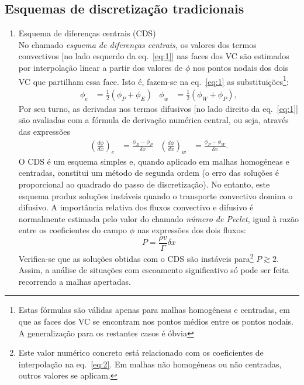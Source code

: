 \documentclass[11pt,twoside]{article}
\begin{document}
{\subsection{Esquemas de discretização tradicionais}
\begin{enumerate}
    \item Esquema de diferenças centrais (CDS)\\
No chamado \emph{esquema de diferenças centrais,} os valores dos termos
convectivos [no lado esquerdo da eq.~\eqref{eq:1}] nas faces dos VC são
estimados por interpolação linear a partir dos valores de $\phi$ nos pontos
nodais dos dois VC que partilham essa face. Isto é, fazem-se na eq.~\eqref{eq:1}
as substituições\footnote{Estas fórmulas são válidas apenas para malhas
    homogéneas e centradas, em que as faces dos VC se encontram nos pontos
    médios entre os pontos nodais. A generalização para os restantes casos é
    óbvia}:
\begin{align}
    \phi_e&= \frac{1}{2}(\phi_P+\phi_E)&
    \phi_w&= \frac{1}{2}(\phi_W+\phi_P),\label{eq:2}
\end{align}
Por seu turno, as derivadas nos termos difusivos [no lado direito da
eq.~\eqref{eq:1}] são avaliadas com a fórmula de derivação numérica central, ou
seja, através das expressões
\begin{align}
    \left(\frac{d\phi}{dx}\right)_e&=
    \frac{\phi_E-\phi_P}{\delta x}&
    \left(\frac{d\phi}{dx}\right)_w&=
    \frac{\phi_P-\phi_W}{\delta x}.
\end{align}
O CDS é um esquema simples e, quando aplicado em malhas homogéneas e centradas,
constitui um método de segunda ordem (o erro das soluções é proporcional ao
quadrado do passo de discretização). No entanto, este esquema produz soluções
instáveis quando o transporte convectivo domina o difusivo.  A importância
relativa dos fluxos convectivo e difusivo é normalmente estimada pelo valor do
chamado \emph{número de Peclet}, igual à razão entre os coeficientes do campo
$\phi$ nas expressões dos dois fluxos:
\begin{equation}
    P=\frac{\rho v}{\Gamma}\delta x
\end{equation}
Verifica-se que as soluções obtidas com o CDS são instáveis para\footnote{Este
    valor numérico concreto está relacionado com os
    coeficientes de interpolação na eq.~\eqref{eq:2}. Em malhas não homogéneas
ou não centradas, outros valores se aplicam.}
$P\gtrsim2$.
Assim, a análise de situações com escoamento significativo só pode ser feita
recorrendo a malhas apertadas.


\end{enumerate}}
\end{document}
